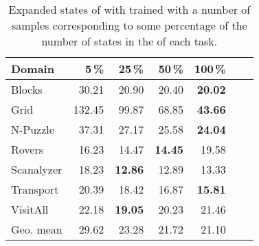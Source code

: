 \begin{table}[ht]
\caption[Expanded states from different sample set sizes.]{Expanded states of \gbfs with \hnnbfsrwl{\meanfx} trained with a number of samples corresponding to some percentage of the number of states in the \fssp of each task.}
\label{tab:small-samples-pct}
\addvspace{\baselineskip}
\centering
\begin{tabular}{lrrrrrr}
Domain & 5\,\% & 25\,\% & 50\,\% & 100\,\% \\
    \midrule
Blocks     & 30.21  & 20.90 & 20.40 & \textbf{20.02} \\
Grid       & 132.45 & 99.87 & 68.85 & \textbf{43.66} \\
N-Puzzle   & 37.31  & 27.17 & 25.58 & \textbf{24.04} \\
Rovers     & 16.23  & 14.47 & \textbf{14.45} & 19.58 \\
Scanalyzer & 18.23  & \textbf{12.86} & 12.89 & 13.33 \\
Transport  & 20.39  & 18.42 & 16.87 & \textbf{15.81} \\
VisitAll   & 22.18  & \textbf{19.05} & 20.23 & 21.46 \\ 
\midrule
Geo. mean  & 29.62 & 23.28 & 21.72 & 21.10 \\
\end{tabular}
\end{table}